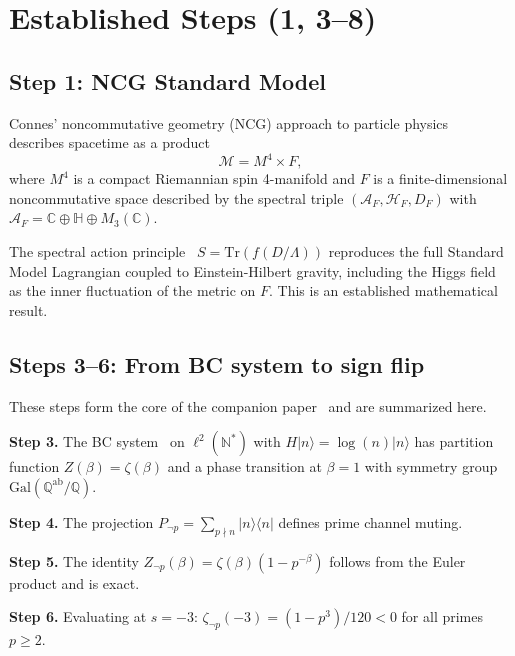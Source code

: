 \documentclass[aps,prd,twocolumn,superscriptaddress,nofootinbib]{revtex4-2}
\newcommand{\Tr}{\mathrm{Tr}}
\newcommand{\Gal}{\mathrm{Gal}}
\begin{document}
\section{Established Steps (1, 3--8)}
\label{sec:established}

\subsection{Step 1: NCG Standard Model}

Connes' noncommutative geometry (NCG) approach to particle
physics~\cite{Connes1996,CCM2007} describes spacetime as a product
\begin{equation}
  \mathcal{M} = M^4 \times F,
\end{equation}
where $M^4$ is a compact Riemannian spin 4-manifold and
$F$ is a finite-dimensional noncommutative space described by the
spectral triple $(\mathcal{A}_F, \mathcal{H}_F, D_F)$ with
$\mathcal{A}_F = \mathbb{C} \oplus \mathbb{H} \oplus M_3(\mathbb{C})$.

The spectral action principle~\cite{CCM2007}
$S = \Tr(f(D/\Lambda))$
reproduces the full Standard Model Lagrangian coupled to
Einstein-Hilbert gravity, including the Higgs field as the
inner fluctuation of the metric on $F$.
This is an established mathematical result.

\subsection{Steps 3--6: From BC system to sign flip}

These steps form the core of the companion paper~\cite{paper_A}
and are summarized here.

\textbf{Step 3.} The BC system~\cite{BostConnes1995} on
$\ell^2(\mathbb{N}^*)$ with $H|n\rangle = \log(n)|n\rangle$
has partition function $Z(\beta) = \zeta(\beta)$ and a phase
transition at $\beta = 1$ with symmetry group
$\Gal(\mathbb{Q}^{\mathrm{ab}}/\mathbb{Q})$.

\textbf{Step 4.} The projection $P_{\neg p} = \sum_{p \nmid n} |n\rangle\langle n|$
defines prime channel muting.

\textbf{Step 5.} The identity
$Z_{\neg p}(\beta) = \zeta(\beta)(1-p^{-\beta})$
follows from the Euler product and is exact.

\textbf{Step 6.} Evaluating at $s = -3$:
$\zeta_{\neg p}(-3) = (1-p^3)/120 < 0$ for all primes $p \geq 2$.
\end{document}
